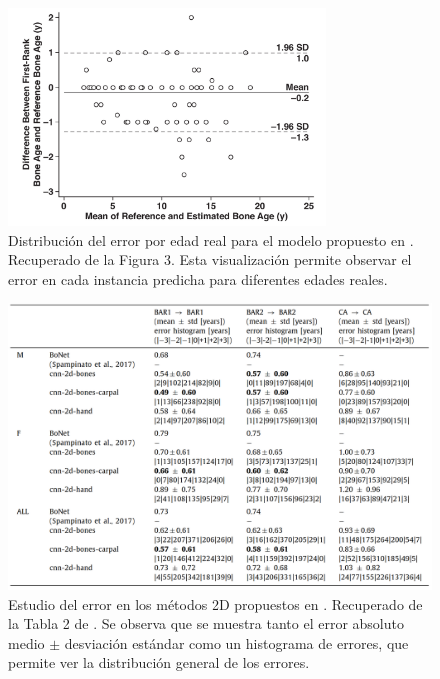 \begin{figure}[htbp]
    \centering
    \includegraphics[width=0.75\textwidth]{capitulos/cap_03/imagenes/error_distribution.png}
    \caption[
        Distribución del error por edad real para el modelo propuesto en \cite{kim2017}. 
    ]{
        Distribución del error por edad real para el modelo propuesto en \cite{kim2017}. 
        Recuperado de la Figura 3.  
        Esta visualización permite observar el error en cada instancia predicha para diferentes edades reales. 
    }
    \label{fig:error_distribution_by_age}
\end{figure}

\begin{figure}[htbp]
    \centering
    \includegraphics[width=\textwidth]{capitulos/cap_03/imagenes/error_study.png}
    \caption[
        Estudio del error en los métodos 2D propuestos en \cite{stern2019}.
    ]{
        Estudio del error en los métodos 2D propuestos en \cite{stern2019}. 
        Recuperado de la Tabla 2 de \cite{stern2019}. 
        Se observa que se muestra tanto el error absoluto medio $\pm$ desviación estándar como un histograma de errores, que permite ver la distribución general de los errores. 
    }
    \label{fig:error_study_stern2019}
\end{figure}


